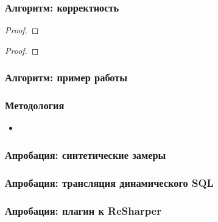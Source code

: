 \documentclass{beamer}
\begin{document}
\begin{frame}
    \transwipe[direction=90]
    \frametitle{Алгоритм: корректность}
    \begin{theorem}

    \end{theorem}

    \begin{proof}


    \end{proof}


    \begin{theorem}

    \end{theorem}

    \begin{proof}


    \end{proof}


\end{frame}

\begin{frame}
    \transwipe[direction=90]
    \frametitle{Алгоритм: пример работы}
\end{frame}

\begin{frame}[t]
    \transwipe[direction=90]
    \frametitle{Методология}
    \begin{itemize}
        \item
    \end{itemize}
\end{frame}

\begin{frame}[t]
    \transwipe[direction=90]
    \frametitle{Апробация: синтетические замеры}
\end{frame}

\begin{frame}[t]
    \transwipe[direction=90]
    \frametitle{Апробация: трансляция динамического SQL}
\end{frame}

\begin{frame}[t]
    \transwipe[direction=90]
    \frametitle{Апробация: плагин к ReSharper}
\end{frame}
\end{document}
